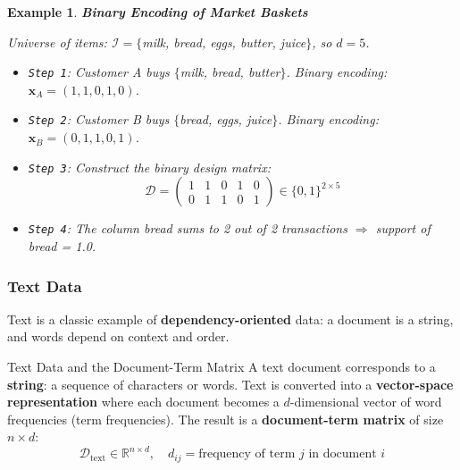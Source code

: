 \documentclass[11pt]{article}
\theoremstyle{smallexample}
\newtheorem{example}{Example}[section]
\newcommand{\vs}{\vspace{0.2\baselineskip}}
\begin{document}
\vs
\begin{example}{\textbf{Binary Encoding of Market Baskets}}

    Universe of items: $\mathcal{I} = \{$milk, bread, eggs, butter, juice$\}$,
    so $d = 5$.
    \begin{itemize}
        \item \texttt{Step 1}: Customer A buys $\{$milk, bread, butter$\}$.
        Binary encoding: $\mathbf{x}_A = (1, 1, 0, 1, 0)$.

        \item \texttt{Step 2}: Customer B buys $\{$bread, eggs, juice$\}$.
        Binary encoding: $\mathbf{x}_B = (0, 1, 1, 0, 1)$.

     
        \item \texttt{Step 3}: Construct the binary design matrix:
        \[
            \mathcal{D} =
            \begin{pmatrix}
                1 & 1 & 0 & 1 & 0 \\
                0 & 1 & 1 & 0 & 1
            \end{pmatrix}
            \in \{0,1\}^{2 \times 5}
        \]

   
        \item \texttt{Step 4}: The column \textit{bread} sums to 2 out of 2 transactions
        $\Rightarrow$ support of bread = 1.0.
    \end{itemize}
\end{example}


\subsubsection{Text Data}

Text is a classic example of \textbf{dependency-oriented} data: a document is a
string, and words depend on context and order.

\begin{defbox}{Text Data and the Document-Term Matrix}
    A text document corresponds to a \textbf{string}: a sequence of characters or
    words. Text is converted into a \textbf{vector-space representation} where each
    document becomes a $d$-dimensional vector of word frequencies (term frequencies).
    The result is a \textbf{document-term matrix} of size $n \times d$:
    \[
        \mathcal{D}_{\text{text}} \in \mathbb{R}^{n \times d}, \quad
        d_{ij} = \text{frequency of term } j \text{ in document } i
    \]

\end{defbox}
\end{document}
